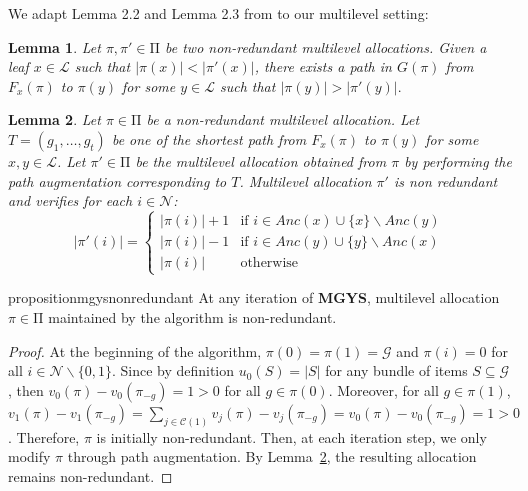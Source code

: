\documentclass[]{article}
\newtheorem{lemma}{Lemma}
\newcommand{\nodes}{\mathcal{N}}
\newcommand{\items}{\mathcal{G}}
\newcommand{\children}{\mathcal{C}}
\newcommand{\leaves}{\mathcal{L}}
\newcommand{\ancestors}{Anc}
\newcommand{\mallocations}{\mathrm{\Pi}}
\begin{document}
We adapt Lemma 2.2 and Lemma 2.3 from \cite{Viswanathan_Zick2023b} to our multilevel setting:
\begin{lemma} \label{lemma: transfer path}
    Let $\pi, \pi' \in \mallocations$ be two non-redundant multilevel allocations. Given a leaf $x \in \leaves$ such that $|\pi(x)| < |\pi'(x)|$, there exists a path in $G(\pi)$ from $F_{x}(\pi)$ to $\pi(y)$ for some $y \in \leaves$ such that $|\pi(y)| > |\pi'(y)|.$
\end{lemma}

\begin{lemma} \label{lemma: path augmentation}
    Let $\pi \in \mallocations$ be a non-redundant multilevel allocation. Let $T = (g_1, \ldots, g_t)$ be one of the shortest path from $F_{x}(\pi)$ to $\pi(y)$ for some $x, y \in \leaves$. Let $\pi' \in \mallocations$ be the multilevel allocation obtained from $\pi$ by performing the path augmentation corresponding to $T$. Multilevel allocation $\pi '$ is non redundant and verifies for each $i \in \nodes$:
    $$
    |\pi'(i)| =\left\{
      \begin{array}{ll}
        |\pi(i)| + 1 & \mbox{if } i \in \ancestors(x) \cup \{x\} \backslash \ancestors(y) \\
        |\pi(i)| - 1 & \mbox{if } i \in \ancestors(y) \cup \{y\} \backslash \ancestors(x) \\
        |\pi(i)| & \mbox{otherwise }
      \end{array}
    \right.
    $$
\end{lemma}

\begin{restatable}{proposition}{mgysnonredundant} \label{lemma: MGYS non redundant}
    At any iteration of \textbf{MGYS}, multilevel allocation $\pi \in \mallocations$ maintained by the algorithm is non-redundant.
\end{restatable}

\begin{proof}
    At the beginning of the algorithm, $\pi(0)=\pi(1)=\items$ and $\pi(i)=0$ for all $i \in \nodes\backslash\{0,1\}$. Since by definition $u_0(S) = |S|$ for any bundle of items $S \subseteq \items$, then $v_0(\pi) - v_0(\pi_{-g}) = 1 >0$ for all $g \in \pi(0)$. Moreover, for all $g \in \pi(1)$, $v_{1}(\pi) - v_{1}(\pi_{-g}) =  \sum_{j \in \children(1)} v_j(\pi)- v_j(\pi_{-g}) = v_0(\pi) - v_0(\pi_{-g}) = 1 >0$. Therefore, $\pi$ is initially non-redundant. 
    Then, at each iteration step, we only modify $\pi$ through path augmentation. By Lemma~\ref{lemma: path augmentation}, the resulting allocation remains non-redundant.
\end{proof}
\end{document}
